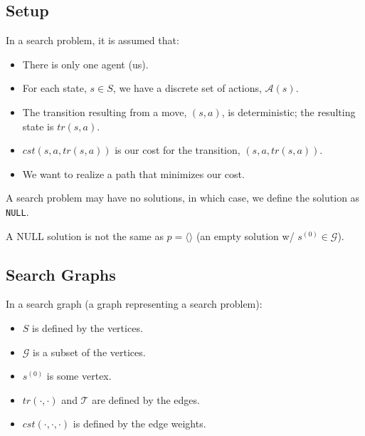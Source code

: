 \subsection{Setup}
\begin{definition} In a search problem, it is assumed that: 
    \begin{itemize}
        \item There is only one agent (us).
        \item For each state, $s \in S$, we have a discrete set of actions, $\mathcal{A}(s)$.
        \item The transition resulting from a move, $(s, a)$, is deterministic; the resulting state is $tr(s, a)$.
        \item $cst(s, a, tr(s, a))$ is our cost for the transition, $(s, a, tr(s, a))$.
        \item We want to realize a path that minimizes our cost.
    \end{itemize}
    
    A search problem may have no solutions, in which case, we define the solution as \texttt{NULL}.
\end{definition}

\begin{warning}
    A NULL solution is not the same as $p = \langle \rangle$ (an empty solution w/ $s^{(0)} \in \mathcal{G}$).
\end{warning}

\subsection{Search Graphs}
\begin{definition}
    In a search graph (a graph representing a search problem):
    \begin{itemize}
        \item $S$ is defined by the vertices.
        \item $\mathcal{G}$ is a subset of the vertices.
        \item $s^{(0)}$ is some vertex.
        \item $tr(\cdot, \cdot)$ and $\mathcal{T}$ are defined by the edges.
        \item $cst(\cdot, \cdot, \cdot)$ is defined by the edge weights.
    \end{itemize}
\end{definition}

